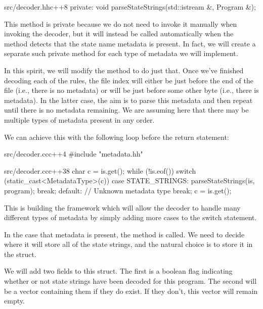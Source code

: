 \begin{file}{src/decoder.hh}{c++}{8}
private:
    void parseStateStrings(std::istream &, Program &);
\end{file}

This method is private because we do not need to invoke it manually when invoking the decoder, but it will instead be called automatically when the  method detects that the state name metadata is present. In fact, we will create a separate such private method for each type of metadata we will implement.

In this spirit, we will modify the  method to do just that. Once we've finished decoding each of the rules, the file index will either be just before the end of the file (i.e., there is no metadata) or will be just before some other byte (i.e., there is metadata). In the latter case, the aim is to parse this metadata and then repeat until there is no metadata remaining. We are assuming here that there may be multiple types of metadata present in any order.

We can achieve this with the following loop before the return statement:

\begin{file}{src/decoder.cc}{c++}{4}
#include "metadata.hh"
\end{file}

\begin{file}{src/decoder.cc}{c++}{38}
    char c = is.get();
    while (!is.eof())
    {
        switch (static_cast<MetadataType>(c))
        {
        case STATE_STRINGS:
            parseStateStrings(is, program);
            break;
        default:
            // Unknown metadata type
            break;
        }
        c = is.get();
    }
\end{file}

This is building the framework which will allow the decoder to handle many different types of metadata by simply adding more cases to the switch statement.

In the case that metadata is present, the  method is called. We need to decide where it will store all of the state strings, and the natural choice is to store it in the  struct.

We will add two fields to this struct. The first is a boolean flag indicating whether or not state strings have been decoded for this program. The second will be a vector containing them if they do exist. If they don't, this vector will remain empty.

